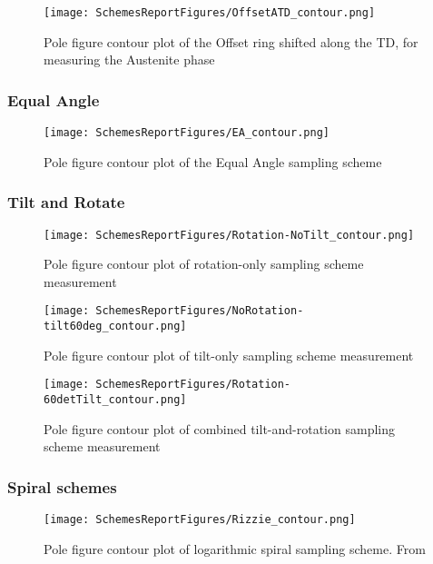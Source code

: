 \documentclass{article}
\begin{document}
\begin{figure}[H]
    \centering
    \texttt{[image: SchemesReportFigures/OffsetATD\_contour.png]}
    \caption{Pole figure contour plot of the Offset ring shifted along the TD, for measuring the Austenite phase}
\end{figure}



\subsubsection{Equal Angle}

\begin{figure}[H]
    \centering
    \texttt{[image: SchemesReportFigures/EA\_contour.png]}
    \caption{Pole figure contour plot of the Equal Angle sampling scheme}
\end{figure}

\subsubsection{Tilt and Rotate}

\begin{figure}[H]
    \centering
    \texttt{[image: SchemesReportFigures/Rotation-NoTilt\_contour.png]}
    \caption{Pole figure contour plot of rotation-only sampling scheme measurement}
\end{figure}


\begin{figure}[H]
    \centering
    \texttt{[image: SchemesReportFigures/NoRotation-tilt60deg\_contour.png]}
    \caption{Pole figure contour plot of tilt-only sampling scheme measurement}
\end{figure}


\begin{figure}[H]
    \centering
    \texttt{[image: SchemesReportFigures/Rotation-60detTilt\_contour.png]}
    \caption{Pole figure contour plot of combined tilt-and-rotation sampling scheme measurement}
\end{figure}



\subsubsection{Spiral schemes}
\begin{figure}[H]
    \centering
    \texttt{[image: SchemesReportFigures/Rizzie\_contour.png]}
    \caption{Pole figure contour plot of logarithmic spiral sampling scheme. From \cite{Rizzie}}
\end{figure}
\end{document}
